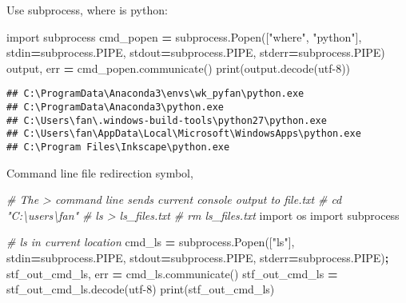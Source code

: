 \documentclass[
]{book}
\newenvironment{Shaded}{\begin{snugshade}}{\end{snugshade}}
\newcommand{\BuiltInTok}[1]{#1}
\newcommand{\CommentTok}[1]{\textcolor[rgb]{0.56,0.35,0.01}{\textit{#1}}}
\newcommand{\ImportTok}[1]{#1}
\newcommand{\NormalTok}[1]{#1}
\newcommand{\OperatorTok}[1]{\textcolor[rgb]{0.81,0.36,0.00}{\textbf{#1}}}
\newcommand{\StringTok}[1]{\textcolor[rgb]{0.31,0.60,0.02}{#1}}
\begin{document}
Use subprocess, where is python:

\begin{Shaded}
\begin{Highlighting}[]
\ImportTok{import}\NormalTok{ subprocess}
\NormalTok{cmd\_popen }\OperatorTok{=}\NormalTok{ subprocess.Popen([}\StringTok{"where"}\NormalTok{, }\StringTok{"python"}\NormalTok{],}
\NormalTok{                             stdin}\OperatorTok{=}\NormalTok{subprocess.PIPE,}
\NormalTok{                             stdout}\OperatorTok{=}\NormalTok{subprocess.PIPE,}
\NormalTok{                             stderr}\OperatorTok{=}\NormalTok{subprocess.PIPE)}
\NormalTok{output, err }\OperatorTok{=}\NormalTok{ cmd\_popen.communicate()}
\BuiltInTok{print}\NormalTok{(output.decode(}\StringTok{\textquotesingle{}utf{-}8\textquotesingle{}}\NormalTok{))}
\end{Highlighting}
\end{Shaded}

\begin{verbatim}
## C:\ProgramData\Anaconda3\envs\wk_pyfan\python.exe
## C:\ProgramData\Anaconda3\python.exe
## C:\Users\fan\.windows-build-tools\python27\python.exe
## C:\Users\fan\AppData\Local\Microsoft\WindowsApps\python.exe
## C:\Program Files\Inkscape\python.exe
\end{verbatim}

Command line file redirection symbol,

\begin{Shaded}
\begin{Highlighting}[]
\CommentTok{\# The \textgreater{} command line sends current console output to file.txt}
\CommentTok{\# cd "C:\textbackslash{}users\textbackslash{}fan"}
\CommentTok{\# ls \textgreater{} ls\_files.txt}
\CommentTok{\# rm ls\_files.txt}
\ImportTok{import}\NormalTok{ os }
\ImportTok{import}\NormalTok{ subprocess }

\CommentTok{\# ls in current location}
\NormalTok{cmd\_ls }\OperatorTok{=}\NormalTok{ subprocess.Popen([}\StringTok{"ls"}\NormalTok{], stdin}\OperatorTok{=}\NormalTok{subprocess.PIPE, stdout}\OperatorTok{=}\NormalTok{subprocess.PIPE, stderr}\OperatorTok{=}\NormalTok{subprocess.PIPE)}\OperatorTok{;}
\NormalTok{stf\_out\_cmd\_ls, err }\OperatorTok{=}\NormalTok{ cmd\_ls.communicate()}
\NormalTok{stf\_out\_cmd\_ls }\OperatorTok{=}\NormalTok{ stf\_out\_cmd\_ls.decode(}\StringTok{\textquotesingle{}utf{-}8\textquotesingle{}}\NormalTok{)}
\BuiltInTok{print}\NormalTok{(stf\_out\_cmd\_ls)}
\end{Highlighting}
\end{Shaded}
\end{document}
